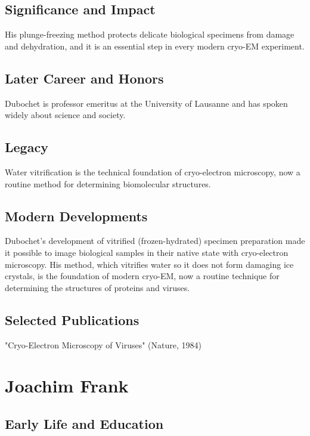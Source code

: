 \subsection*{Significance and Impact}

His plunge-freezing method protects delicate biological specimens from damage and dehydration, and it is an essential step in every modern cryo-EM experiment.

\subsection*{Later Career and Honors}

Dubochet is professor emeritus at the University of Lausanne and has spoken widely about science and society.

\subsection*{Legacy}

Water vitrification is the technical foundation of cryo-electron microscopy, now a routine method for determining biomolecular structures.

\subsection*{Modern Developments}

Dubochet's development of vitrified (frozen-hydrated) specimen preparation made it possible to image biological samples in their native state with cryo-electron microscopy. His method, which vitrifies water so it does not form damaging ice crystals, is the foundation of modern cryo-EM, now a routine technique for determining the structures of proteins and viruses.

\subsection*{Selected Publications}

"Cryo-Electron Microscopy of Viruses" (Nature, 1984)

\clearpage

\section{Joachim Frank}

\subsection*{Early Life and Education}

